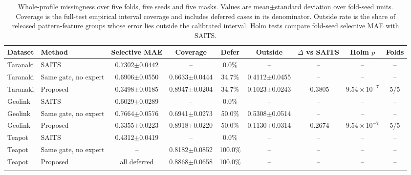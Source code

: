 \begin{table}
\caption{Whole-profile missingness over five folds, five seeds and five masks.
Values are mean$\pm$standard deviation over fold-seed units. Coverage is the
full-test empirical interval coverage and includes deferred cases in its
denominator. Outside rate is the share of released pattern-feature groups whose
error lies outside the calibrated interval. Holm tests compare fold-seed
selective MAE with SAITS.}
\label{tab:profile}
\centering
\scriptsize
\setlength{\tabcolsep}{4.2pt}
\begin{tabular*}{\textwidth}{@{\extracolsep{\fill}}llccccccc@{}}
\toprule
Dataset & Method & Selective MAE & Coverage & Defer & Outside & $\Delta$ vs SAITS & Holm $p$ & Folds \\
\midrule
Taranaki & SAITS & 0.7302$\pm$0.0442 & -- & 0.0\% & -- & -- & -- & -- \\
Taranaki & Same gate, no expert & 0.6906$\pm$0.0550 & 0.6633$\pm$0.0444 & 34.7\% & 0.4112$\pm$0.0455 & -- & -- & -- \\
Taranaki & Proposed & 0.3498$\pm$0.0185 & 0.8947$\pm$0.0204 & 34.7\% & 0.1023$\pm$0.0243 & -0.3805 & $9.54\times10^{-7}$ & 5/5 \\
\addlinespace[2pt]
Geolink & SAITS & 0.6029$\pm$0.0289 & -- & 0.0\% & -- & -- & -- & -- \\
Geolink & Same gate, no expert & 0.7664$\pm$0.0576 & 0.6941$\pm$0.0273 & 50.0\% & 0.5308$\pm$0.0514 & -- & -- & -- \\
Geolink & Proposed & 0.3355$\pm$0.0223 & 0.8918$\pm$0.0220 & 50.0\% & 0.1130$\pm$0.0314 & -0.2674 & $9.54\times10^{-7}$ & 5/5 \\
\addlinespace[2pt]
Teapot & SAITS & 0.4312$\pm$0.0419 & -- & 0.0\% & -- & -- & -- & -- \\
Teapot & Same gate, no expert & -- & 0.8182$\pm$0.0852 & 100.0\% & -- & -- & -- & -- \\
Teapot & Proposed & all deferred & 0.8868$\pm$0.0658 & 100.0\% & -- & -- & -- & -- \\
\addlinespace[2pt]
\bottomrule
\end{tabular*}
\end{table}
